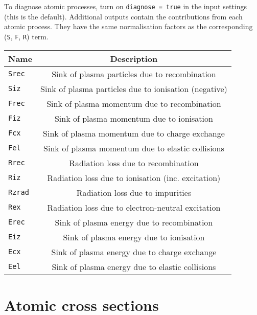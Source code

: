 \documentclass[12pt,a4paper]{article}
\begin{document}
\noindent To diagnose atomic processes, turn on \texttt{diagnose = true} in the input settings (this is the default).
Additional outputs contain the contributions from each atomic process. They have the same normalisation
factors as the corresponding (\texttt{S}, \texttt{F}, \texttt{R}) term.
\begin{center}
\begin{tabular}{l c}
  Name & Description\\
  \hline
  \texttt{Srec} & Sink of plasma particles due to recombination \\
  \texttt{Siz}  & Sink of plasma particles due to ionisation (negative) \\
  \hline
  \texttt{Frec} & Sink of plasma momentum due to recombination \\
  \texttt{Fiz}  & Sink of plasma momentum due to ionisation \\
  \texttt{Fcx}  & Sink of plasma momentum due to charge exchange \\
  \texttt{Fel}  & Sink of plasma momentum due to elastic collisions \\
  \hline
  \texttt{Rrec} & Radiation loss due to recombination \\
  \texttt{Riz}  & Radiation loss due to ionisation (inc. excitation) \\
  \texttt{Rzrad} & Radiation loss due to impurities \\
  \texttt{Rex}  & Radiation loss due to electron-neutral excitation \\
  \hline
  \texttt{Erec} & Sink of plasma energy due to recombination \\
  \texttt{Eiz}  & Sink of plasma energy due to ionisation \\
  \texttt{Ecx}  & Sink of plasma energy due to charge exchange \\
  \texttt{Eel}  & Sink of plasma energy due to elastic collisions \\
  \hline
\end{tabular}
\end{center}

\section{Atomic cross sections}
\end{document}
